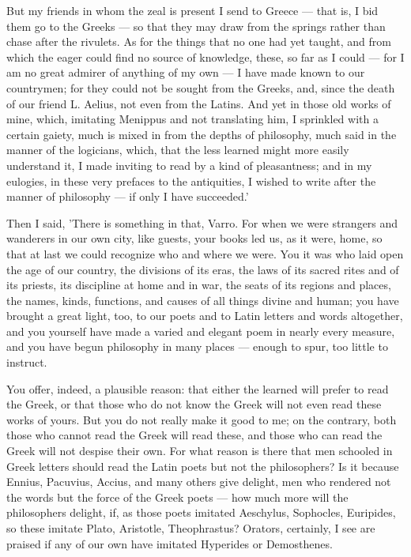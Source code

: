  But my friends in whom the zeal is present I send to Greece — that is, I bid them go to the Greeks — so that they may draw from the springs rather than chase after the rivulets. As for the things that no one had yet taught, and from which the eager could find no source of knowledge, these, so far as I could — for I am no great admirer of anything of my own — I have made known to our countrymen; for they could not be sought from the Greeks, and, since the death of our friend L. Aelius, not even from the Latins. And yet in those old works of mine, which, imitating Menippus and not translating him, I sprinkled with a certain gaiety, much is mixed in from the depths of philosophy, much said in the manner of the logicians, which, that the less learned might more easily understand it, I made inviting to read by a kind of pleasantness; and in my eulogies, in these very prefaces to the antiquities, I wished to write after the manner of philosophy — if only I have succeeded.'

 Then I said, 'There is something in that, Varro. For when we were strangers and wanderers in our own city, like guests, your books led us, as it were, home, so that at last we could recognize who and where we were. You it was who laid open the age of our country, the divisions of its eras, the laws of its sacred rites and of its priests, its discipline at home and in war, the seats of its regions and places, the names, kinds, functions, and causes of all things divine and human; you have brought a great light, too, to our poets and to Latin letters and words altogether, and you yourself have made a varied and elegant poem in nearly every measure, and you have begun philosophy in many places — enough to spur, too little to instruct.

 You offer, indeed, a plausible reason: that either the learned will prefer to read the Greek, or that those who do not know the Greek will not even read these works of yours. But you do not really make it good to me; on the contrary, both those who cannot read the Greek will read these, and those who can read the Greek will not despise their own. For what reason is there that men schooled in Greek letters should read the Latin poets but not the philosophers? Is it because Ennius, Pacuvius, Accius, and many others give delight, men who rendered not the words but the force of the Greek poets — how much more will the philosophers delight, if, as those poets imitated Aeschylus, Sophocles, Euripides, so these imitate Plato, Aristotle, Theophrastus? Orators, certainly, I see are praised if any of our own have imitated Hyperides or Demosthenes.

